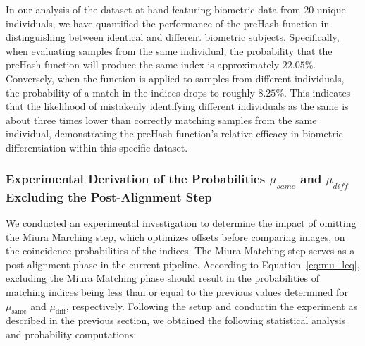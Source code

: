 In our analysis of the dataset at hand featuring biometric data from 20 unique individuals, we have quantified the performance of the preHash function in distinguishing between identical and different biometric subjects. Specifically, when evaluating samples from the same individual, the probability that the preHash function will produce the same index is approximately \(22.05\%\). Conversely, when the function is applied to samples from different individuals, the probability of a match in the indices drops to roughly \(8.25\%\). This indicates that the likelihood of mistakenly identifying different individuals as the same is about three times lower than correctly matching samples from the same individual, demonstrating the preHash function's relative efficacy in biometric differentiation within this specific dataset.


\subsubsection{Experimental Derivation of the Probabilities \(\mu_{same}\) and \(\mu_{diff}\) Excluding the Post-Alignment Step}

We conducted an experimental investigation to determine the impact of omitting the Miura Marching step, which optimizes offsets before comparing images, on the coincidence probabilities of the indices. The Miura Matching step serves as a post-alignment phase in the current pipeline. According to Equation~\ref{eq:mu_leq}, excluding the Miura Matching phase should result in the probabilities of matching indices being less than or equal to the previous values determined for \(\mu_{\text{same}}\) and \(\mu_{\text{diff}}\), respectively.
Following the setup and conductin the experiment as described in the previous section, we obtained the following statistical analysis and probability computations:



